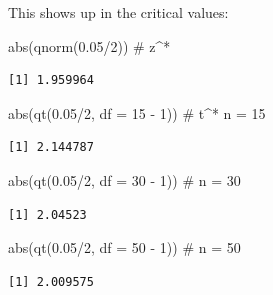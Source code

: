\documentclass[
  letterpaper,
  DIV=11,
  numbers=noendperiod,
  oneside]{scrreprt}
\newenvironment{Shaded}{\begin{snugshade}}{\end{snugshade}}
\newcommand{\AttributeTok}[1]{\textcolor[rgb]{0.40,0.45,0.13}{#1}}
\newcommand{\CommentTok}[1]{\textcolor[rgb]{0.37,0.37,0.37}{#1}}
\newcommand{\DecValTok}[1]{\textcolor[rgb]{0.68,0.00,0.00}{#1}}
\newcommand{\FloatTok}[1]{\textcolor[rgb]{0.68,0.00,0.00}{#1}}
\newcommand{\FunctionTok}[1]{\textcolor[rgb]{0.28,0.35,0.67}{#1}}
\newcommand{\NormalTok}[1]{\textcolor[rgb]{0.00,0.23,0.31}{#1}}
\newcommand{\SpecialCharTok}[1]{\textcolor[rgb]{0.37,0.37,0.37}{#1}}
\begin{document}
This shows up in the critical values:

\begin{Shaded}
\begin{Highlighting}[]
\FunctionTok{abs}\NormalTok{(}\FunctionTok{qnorm}\NormalTok{(}\FloatTok{0.05}\SpecialCharTok{/}\DecValTok{2}\NormalTok{)) }\CommentTok{\# z\^{}*}
\end{Highlighting}
\end{Shaded}

\begin{verbatim}
[1] 1.959964
\end{verbatim}

\begin{Shaded}
\begin{Highlighting}[]
\FunctionTok{abs}\NormalTok{(}\FunctionTok{qt}\NormalTok{(}\FloatTok{0.05}\SpecialCharTok{/}\DecValTok{2}\NormalTok{, }\AttributeTok{df =} \DecValTok{15} \SpecialCharTok{{-}} \DecValTok{1}\NormalTok{)) }\CommentTok{\# t\^{}* n = 15}
\end{Highlighting}
\end{Shaded}

\begin{verbatim}
[1] 2.144787
\end{verbatim}

\begin{Shaded}
\begin{Highlighting}[]
\FunctionTok{abs}\NormalTok{(}\FunctionTok{qt}\NormalTok{(}\FloatTok{0.05}\SpecialCharTok{/}\DecValTok{2}\NormalTok{, }\AttributeTok{df =} \DecValTok{30} \SpecialCharTok{{-}} \DecValTok{1}\NormalTok{)) }\CommentTok{\# n = 30}
\end{Highlighting}
\end{Shaded}

\begin{verbatim}
[1] 2.04523
\end{verbatim}

\begin{Shaded}
\begin{Highlighting}[]
\FunctionTok{abs}\NormalTok{(}\FunctionTok{qt}\NormalTok{(}\FloatTok{0.05}\SpecialCharTok{/}\DecValTok{2}\NormalTok{, }\AttributeTok{df =} \DecValTok{50} \SpecialCharTok{{-}} \DecValTok{1}\NormalTok{)) }\CommentTok{\# n = 50}
\end{Highlighting}
\end{Shaded}

\begin{verbatim}
[1] 2.009575
\end{verbatim}
\end{document}
